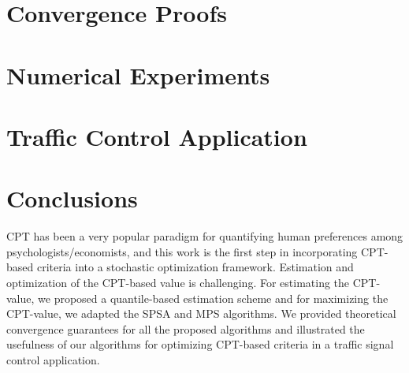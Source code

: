 \documentclass[twocolumn]{IEEEtran}
\begin{document}
\section{Convergence Proofs}
\label{sec:convergence}

\section{Numerical Experiments}
\label{sec:expts-simple}


\section{Traffic Control Application}
\label{sec:expts}





\section{Conclusions}
\label{sec:conclusions}
CPT has been a very popular paradigm for quantifying human preferences 
among psychologists/economists, and this work is the first step in incorporating CPT-based criteria into a stochastic optimization framework. Estimation and optimization of the CPT-based value is challenging. 
For estimating the CPT-value, we proposed a quantile-based estimation scheme and for maximizing the CPT-value, we adapted the SPSA \cite{spall} and MPS \cite{chang2013simulation} algorithms. 
We provided theoretical convergence guarantees for all the proposed algorithms and illustrated the usefulness of our algorithms for optimizing CPT-based criteria in a traffic signal control application.



%
\end{document}
